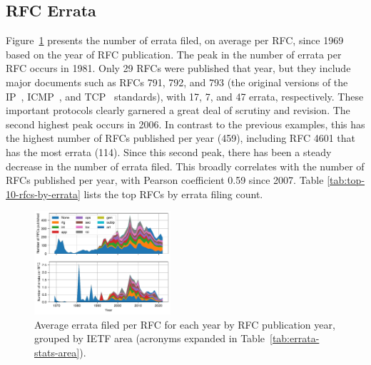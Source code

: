 \documentclass[twocolumn,10pt]{article}
\newcommand{\pb}[1]{\vspace{0.75ex}\noindent{\textbf{#1}}}
\begin{document}
\subsection{RFC Errata}


\pb{Errata over Time:}
Figure~\ref{fig:errata_per_year} presents the number of errata filed, on
average per RFC, since 1969 based on the year of RFC publication.  The peak
in the number of errata per RFC occurs in 1981. Only 29 RFCs were published
that year, but they include major documents such as RFCs 791, 792, and 793
(the original versions of the IP~\cite{rfc791}, ICMP~\cite{rfc792}, and
TCP~\cite{rfc793} standards), with 17, 7, and 47 errata, respectively.
These important protocols clearly garnered a great deal of scrutiny and
revision.  The second highest peak occurs in 2006.  In contrast to the
previous examples, this has the highest number of RFCs published per year
(459), including RFC 4601 \cite{RFC4601} that has the most errata (114).
Since this second peak, there has been a steady decrease in the number of
errata filed.  This broadly correlates with the number of RFCs published
per year, with Pearson coefficient 0.59 since 2007.  Table
\ref{tab:top-10-rfcs-by-errata} lists the top RFCs by errata filing count.

\begin{figure}
\includegraphics[width=0.45\textwidth]{figures-prev/tma-2023/errata-by-year.pdf}
\caption{Average errata filed per RFC for each year by RFC publication year,
grouped by IETF area (acronyms expanded in Table~\ref{tab:errata-stats-area}).}
\label{fig:errata_per_year}
\end{figure}



\end{document}
